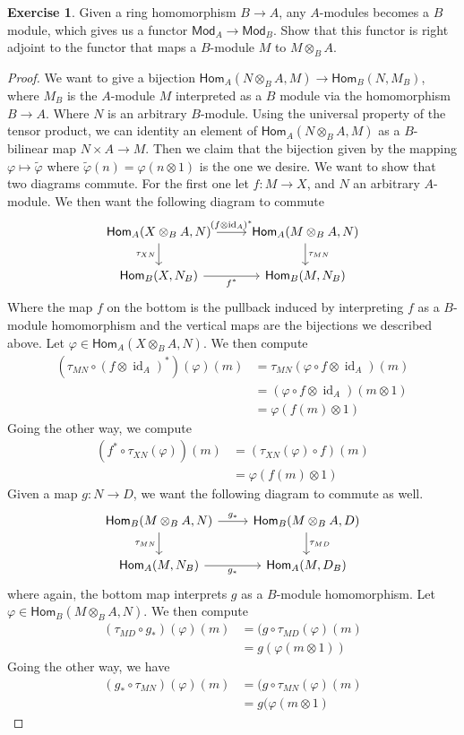 \documentclass[psamsfonts]{amsart}
\theoremstyle{definition}
\newtheorem{exer}[thm]{Exercise}
\theoremstyle{remark}
\renewcommand{\hom}{\mathsf{Hom}}
\DeclareMathOperator{\id}{id}
\begin{document}
%
\begin{exer}
Given a ring homomorphism $B \to A$, any $A$-modules becomes a $B$ module, which gives us a functor $\mathsf{Mod}_A \to \mathsf{Mod}_B$. Show that this functor is right adjoint to the functor that maps a $B$-module $M$ to $M \otimes_B A$.
\end{exer}
%
\begin{proof}
We want to give a bijection $\hom_A(N \otimes_B A, M) \to \hom_B(N, M_B)$, where $M_B$ is the $A$-module $M$ interpreted as a $B$ module via the homomorphism $B \to A$. Where $N$ is an arbitrary $B$-module. Using the universal property of the tensor product, we can identity an element of $\hom_A(N \otimes_B A, M)$ as a $B$-bilinear map $N \times A \to M$. Then we claim that the bijection given by the mapping $\varphi \mapsto \tilde{\varphi}$ where $\tilde{\varphi}(n) = \varphi(n \otimes 1)$ is the one we desire. We want to show that two diagrams commute. For the first one let $f: M \to X$, and $N$ an arbitrary $A$-module. We then want the following diagram to commute
$$\begin{tikzcd}
\hom_A(X \otimes_B A,N) \arrow[d, "\tau_{XN}"'] \arrow[r, "(f \otimes \id_A)^*"] & \hom_A(M \otimes_B A, N) \arrow[d, "\tau_{MN}"] \\
\hom_B(X, N_B) \arrow[r, "f^*"'] & \hom_B(M,N_B)
\end{tikzcd}$$
Where the map $f$ on the bottom is the pullback induced by interpreting $f$ as a $B$-module homomorphism and the vertical maps are the bijections we described above. Let $\varphi \in \hom_A(X \otimes_B A, N)$. We then compute
\begin{align*}
(\tau_{MN} \circ (f\otimes\id_A)^*)(\varphi)(m) &= \tau_{MN}(\varphi \circ f \otimes\id_A)(m) \\
&= (\varphi \circ f\otimes\id_A)(m \otimes 1) \\
&= \varphi(f(m) \otimes 1)
\end{align*}
Going the other way, we compute
\begin{align*}
(f^* \circ \tau_{XN}(\varphi))(m) &= (\tau_{XN}(\varphi) \circ f)(m) \\
&= \varphi(f(m) \otimes 1)
\end{align*}
Given a map $g: N \to D$, we want the following diagram to commute as well.
$$\begin{tikzcd}
\hom_B(M \otimes_B A, N) \arrow[d, "\tau_{MN}"'] \arrow[r, "g_*"] & \hom_B(M \otimes_B A, D) \arrow[d, "\tau_{MD}"] \\
\hom_A(M, N_B) \arrow[r, "g_*"'] & \hom_A(M, D_B)
\end{tikzcd}$$
where again, the bottom map interprets $g$ as a $B$-module homomorphism. Let $\varphi \in \hom_B(M \otimes_B A,N)$. We then compute
\begin{align*}
(\tau_{MD} \circ g_*)(\varphi)(m) &= (g \circ \tau_{MD}(\varphi)(m) \\
&= g(\varphi(m \otimes 1))
\end{align*}
Going the other way, we have
\begin{align*}
(g_* \circ \tau_{MN})(\varphi)(m) &= (g \circ \tau_{MN}(\varphi)(m) \\
&= g(\varphi(m \otimes 1)
\end{align*}
\end{proof}
\end{document}
